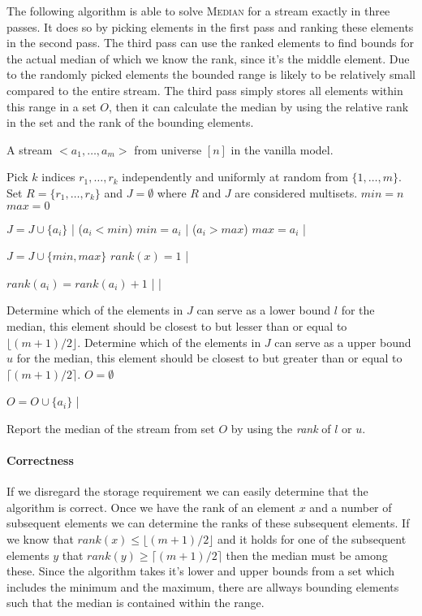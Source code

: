 The following algorithm is able to solve \textsc{Median} for a stream exactly in three passes.
It does so by picking elements in the first pass and ranking these elements in the second pass.
The third pass can use the ranked elements to find bounds for the actual median of which we know the rank, since it's the middle element.
Due to the randomly picked elements the bounded range is likely to be relatively small compared to the entire stream.
The third pass simply stores all elements within this range in a set $O$, then it can calculate the median by using the relative rank in the set and the rank of the bounding elements.

\begin{sourcecode}
A stream $<a_1, \ldots , a_m>$ from universe $[n]$ in the vanilla model.
\silend

Pick $k$ indices $r_1, \ldots , r_k$ independently and uniformly at random from $\{1, \ldots , m\}$.
Set $R = \{r_1, \ldots , r_k\}$ and $J = \emptyset$ where $R$ and $J$ are considered multisets.
$\textit{min} = n$
$\textit{max} = 0$
\silend

	$J = J \cup \{a_i\}$
|
\qif($a_i < \textit{min}$)
	$\textit{min} = a_i$
|
\qif($a_i > \textit{max}$)
	$\textit{max} = a_i$
|
\silend

$J = J \cup \{min, max\}$
	$\textit{rank}(x) = 1$
|
\silend

		$\textit{rank}(a_i) = \textit{rank}(a_i) + 1$
	|
|
\silend

Determine which of the elements in $J$ can serve as a lower bound $l$ for the median, this element should be closest to but lesser than or equal to $\lfloor (m+1)/2 \rfloor$.
Determine which of the elements in $J$ can serve as a upper bound $u$ for the median, this element should be closest to but greater than or equal to $\lceil (m+1)/2 \rceil$.
$O = \emptyset$
\silend

	$O = O \cup \{a_i\}$
|
\silend

Report the median of the stream from set $O$ by using the \textit{rank} of $l$ or $u$.
\qend
\end{sourcecode}

\paragraph{Correctness}
If we disregard the storage requirement we can easily determine that the algorithm is correct. Once we have the rank of an element $x$ and a number of subsequent elements we can determine the ranks of these subsequent elements. If we know that $\textit{rank}(x) \leq \lfloor (m+1)/2 \rfloor$ and it holds for one of the subsequent elements $y$ that $\textit{rank}(y) \geq \lceil (m+1)/2 \rceil$ then the median must be among these. Since the algorithm takes it's lower and upper bounds from a set which includes the minimum and the maximum, there are allways bounding elements such that the median is contained within the range.


